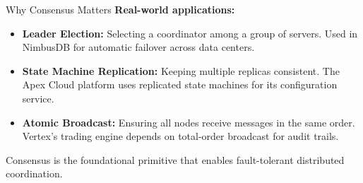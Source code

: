 \documentclass[11pt,aspectratio=169]{beamer}
\begin{document}
\begin{frame}{Why Consensus Matters}
\textbf{Real-world applications:}

\vspace{8pt}
\begin{itemize}
  \item \textbf{Leader Election:} Selecting a coordinator among a group of servers. Used in NimbusDB for automatic failover across data centers.

  \vspace{6pt}
  \item \textbf{State Machine Replication:} Keeping multiple replicas consistent. The Apex Cloud platform uses replicated state machines for its configuration service.

  \vspace{6pt}
  \item \textbf{Atomic Broadcast:} Ensuring all nodes receive messages in the same order. Vertex's trading engine depends on total-order broadcast for audit trails.
\end{itemize}

\vspace{10pt}
\begin{tcolorbox}[exblock,title={Key Insight}]
Consensus is the foundational primitive that enables fault-tolerant distributed coordination.
\end{tcolorbox}
\end{frame}
\end{document}
